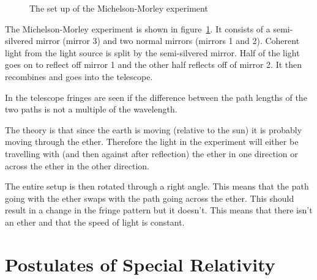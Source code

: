 \documentclass{article}
\begin{document}
    \begin{figure}[ht]
        \centering
        \caption{The set up of the Michelson-Morley experiment}
        \label{Michelson-Morley setup}
    \end{figure}
    The Michelson-Morley experiment is shown in figure~\ref{Michelson-Morley setup}. 
    It consists of a semi-silvered mirror (mirror 3) and two normal mirrors (mirrors 1 and 2).
    Coherent light from the light source is split by the semi-silvered mirror. 
    Half of the light goes on to reflect off mirror 1 and the other half reflects off of mirror 2. 
    It then recombines and goes into the telescope.
    
    In the telescope fringes are seen if the difference between the path lengths of the two paths is not a multiple of the wavelength.
    
    The theory is that since the earth is moving (relative to the sun) it is probably moving through the ether. 
    Therefore the light in the experiment will either be travelling with (and then against after reflection) the ether in one direction or across the ether in the other direction.
    
    The entire setup is then rotated through a right angle. 
    This means that the path going with the ether swaps with the path going across the ether. 
    This should result in a change in the fringe pattern but it doesn't.
    This means that there isn't an ether and that the speed of light is constant.
    
    \section{Postulates of Special Relativity}
    
\end{document}
